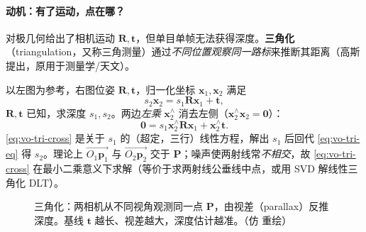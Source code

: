 \paragraph{动机：有了运动，点在哪？}对极几何给出了相机运动 $\mathbf{R},\mathbf{t}$，但单目单帧无法获得深度。\textbf{三角化}（triangulation，又称三角测量）通过\emph{不同位置观察同一路标}来推断其距离\cite{gaoxiang2019slam14}（高斯提出，原用于测量学/天文）。

\begin{derivation}[三角化的最小二乘方程]
\label{thm:vo-tri}
以左图为参考，右图位姿 $\mathbf{R},\mathbf{t}$，归一化坐标 $\mathbf{x}_1,\mathbf{x}_2$ 满足\cite{gaoxiang2019slam14}
\begin{equation}
  s_2\mathbf{x}_2=s_1\mathbf{R}\mathbf{x}_1+\mathbf{t},
  \label{eq:vo-tri-eq}
\end{equation}
$\mathbf{R},\mathbf{t}$ 已知，求深度 $s_1,s_2$。两边\emph{左乘} $\mathbf{x}_2^\wedge$ 消去左侧（$\mathbf{x}_2^\wedge\mathbf{x}_2=\mathbf{0}$）：
\begin{equation}
  \mathbf{0}=s_1\mathbf{x}_2^\wedge\mathbf{R}\mathbf{x}_1+\mathbf{x}_2^\wedge\mathbf{t}.
  \label{eq:vo-tri-cross}
\end{equation}
\cref{eq:vo-tri-cross} 是关于 $s_1$ 的（超定，三行）线性方程，解出 $s_1$ 后回代 \cref{eq:vo-tri-eq} 得 $s_2$。理论上 $\overrightarrow{O_1\mathbf{p}_1}$ 与 $\overrightarrow{O_2\mathbf{p}_2}$ 交于 $\mathbf{P}$；噪声使两射线常\emph{不相交}，故 \cref{eq:vo-tri-cross} 在最小二乘意义下求解（等价于求两射线公垂线中点，或用 SVD 解线性三角化 DLT）。
\end{derivation}

\begin{figure}[ht]
\centering
{}
\caption{三角化：两相机从不同视角观测同一点 $\mathbf{P}$，由视差（parallax）反推深度。基线 $\mathbf{t}$ 越长、视差越大，深度估计越准。（仿\cite{gaoxiang2019slam14} 重绘）}
\label{fig:vo-tri}
\end{figure}

